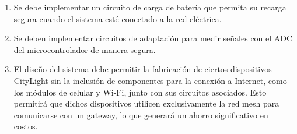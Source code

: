 \documentclass[
11pt, %
]{charter}
\begin{document}
\begin{enumerate}
\begin{enumerate}
			\item Se debe implementar un circuito de carga de batería que permita su recarga segura cuando el sistema esté conectado a la red eléctrica.
			\item Se deben implementar circuitos de adaptación para medir señales con el ADC del microcontrolador de manera segura.
			\item  El diseño del sistema debe permitir la fabricación de ciertos dispositivos CityLight sin la inclusión de componentes para la conexión a Internet, como los módulos de celular y Wi-Fi,  junto con sus circuitos asociados. Esto permitirá que dichos dispositivos utilicen exclusivamente la red mesh para comunicarse con un gateway, lo que generará un ahorro significativo en costos.
		\end{enumerate}


\end{enumerate}
\end{document}
